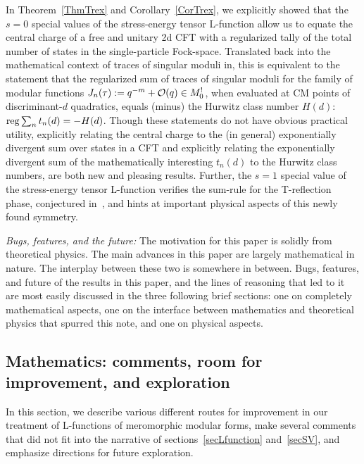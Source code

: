 \documentclass[11pt,a4paper]{article}
\newcommand{\reg}{{\rm reg}}
\begin{document}
In Theorem~\ref{ThmTrex} and Corollary~\ref{CorTrex}, we explicitly showed that the $s = 0$ special values of the stress-energy tensor L-function allow us to equate the central charge of a free and unitary 2d CFT with a regularized tally of the total number of states in the single-particle Fock-space. Translated back into the mathematical context of traces of singular moduli in, this is equivalent to the statement that the regularized sum of traces of singular moduli for the family of modular functions $J_n(\tau) := q^{-m} + {\cal O}(q) \in M_0^!$, when evaluated at CM points of discriminant-$d$ quadratics, equals (minus) the Hurwitz class number $H(d)$: $\reg \sum_n t_n(d) = -H(d)$. Though these statements do not have obvious practical utility, explicitly relating the central charge to the (in general) exponentially divergent sum over states in a CFT and explicitly relating the exponentially divergent sum of the mathematically interesting $t_n(d)$ to the Hurwitz class numbers, are both new and pleasing results. Further, the $s = 1$ special value of the stress-energy tensor L-function verifies the sum-rule for the T-reflection phase, conjectured in~\cite{06T-rex1, 07T-rex2}, and hints at important physical aspects of this newly found symmetry.

{\em Bugs, features, and the future:} The motivation for this paper is solidly from theoretical physics. The main advances in this paper are largely mathematical in nature. The interplay between these two is somewhere in between. Bugs, features, and future of the results in this paper, and the lines of reasoning that led to it are most easily discussed in the three following brief sections: one on completely mathematical aspects, one on the interface between mathematics and theoretical physics that spurred this note, and one on physical aspects.


\subsection{Mathematics: comments, room for improvement, and exploration}

In this section, we describe various different routes for improvement in our treatment of L-functions of meromorphic modular forms, make several comments that did not fit into the narrative of sections~\ref{secLfunction} and~\ref{secSV}, and emphasize directions for future exploration. 
\end{document}
